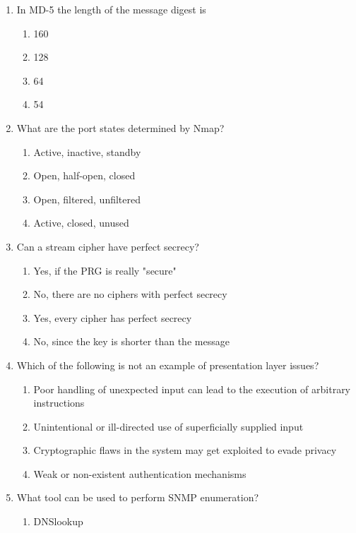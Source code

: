 \documentclass[12pt]{article}
\begin{document}
\begin{enumerate}[label=\arabic*.]
\begin{enumerate}[label=(\alph*)]
    \item wireless handshaking
\end{enumerate}
\item In MD-5 the length of the message digest is
\begin{enumerate}[label=(\alph*)]
    \item 160
    \item 128
    \item 64
    \item 54
\end{enumerate}
\item What are the port states determined by Nmap?
\begin{enumerate}[label=(\alph*)]
    \item Active, inactive, standby
    \item Open, half-open, closed
    \item Open, filtered, unfiltered
    \item Active, closed, unused
\end{enumerate}
\item Can a stream cipher have perfect secrecy?
\begin{enumerate}[label=(\alph*)]
    \item Yes, if the PRG is really "secure"
    \item No, there are no ciphers with perfect secrecy
    \item Yes, every cipher has perfect secrecy
    \item No, since the key is shorter than the message
\end{enumerate}
\item Which of the following is not an example of presentation layer issues?
\begin{enumerate}[label=(\alph*)]
    \item Poor handling of unexpected input can lead to the execution of arbitrary instructions
    \item Unintentional or ill-directed use of superficially supplied input
    \item Cryptographic flaws in the system may get exploited to evade privacy
    \item Weak or non-existent authentication mechanisms
\end{enumerate}
\item What tool can be used to perform SNMP enumeration?
\begin{enumerate}[label=(\alph*)]
    \item DNSlookup

\end{enumerate}
\end{enumerate}
\end{document}

